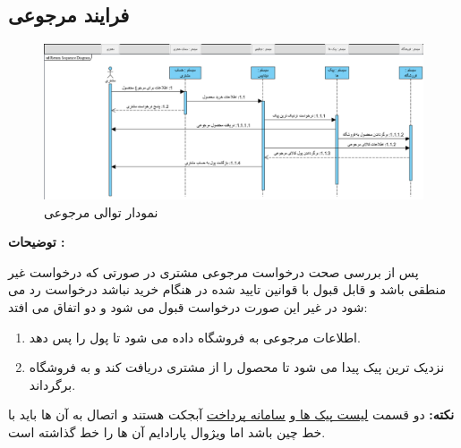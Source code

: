 \documentclass[12pt,a4paper]{article}
\begin{document}
	\subsection{فرایند مرجوعی} \label{section.sequence.return}
		\begin{figure}[h!]
			\begin{center}
				\includegraphics[width=14cm]{images/Return Sequence Diagram.png}
			\end{center}
			\caption{نمودار توالی مرجوعی}
		\end{figure}
				
		\textbf{توضیحات :} 
		
		
		پس از بررسی صحت درخواست مرجوعی مشتری در صورتی که درخواست غیر منطقی باشد و قابل قبول با قوانین تایید شده در هنگام خرید نباشد درخواست رد می شود در غیر این صورت درخواست قبول می شود و دو اتفاق می افتد:
		\begin{enumerate}
			\item
			اطلاعات مرجوعی به فروشگاه داده می شود تا پول را پس دهد.
			\item
			نزدیک ترین پیک پیدا می شود تا محصول را از مشتری دریافت کند و به فروشگاه برگرداند.
		\end{enumerate}
		\textbf{نکته: }دو قسمت \underline{لیست پیک ها }و \underline{سامانه پرداخت} آبجکت هستند و اتصال به آن ها باید با خط چین باشد اما ویژوال پارادایم آن ها را خط گذاشته است.
		
		\pagebreak
\end{document}
